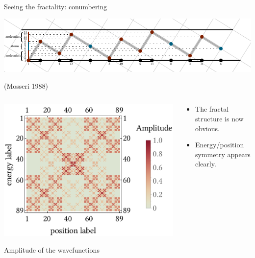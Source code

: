 \documentclass[xcolor=x11names,compress,professionalfonts]{beamer}
\renewcommand{\(}{\begin{columns}}
\renewcommand{\)}{\end{columns}}
\newcommand{\<}[1]{\begin{column}{#1}}
\renewcommand{\>}{\end{column}}
\begin{document}
\begin{frame}{Seeing the fractality: conumbering}
		{\centering
		\includegraphics[scale=.85]{inclined_cut_and_project.pdf}
		
		}
		
		\begin{flushright}
		(Mosseri 1988)
		\end{flushright}
		
		\begin{columns}
	\begin{column}{7cm}
		\centering
		\includegraphics[scale=.4]{ldos_reordered.pdf}
		
		\scriptsize{Amplitude of the wavefunctions}	
	\end{column}
	\begin{column}{6cm}
		\begin{itemize}
			\item The fractal structure is now obvious.
			\item Energy/position symmetry appears clearly.
		\end{itemize}
	\end{column}
\end{columns}
		
\end{frame}
\end{document}
